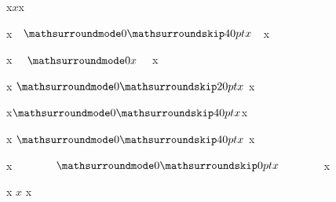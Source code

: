 \startTEXpage[width=6cm] \showmakeup[math]
    x$x$x

    x$\mathsurroundmode0\mathsurroundskip40pt\mathsurround10pt x$x

    x $\mathsurroundmode0\mathsurround10pt x$ x

    x $\mathsurroundmode0\mathsurroundskip20pt x$ x

    x$\mathsurroundmode0\mathsurroundskip40pt \mathsurround0pt x$x

    x $\mathsurroundmode0\mathsurroundskip40pt \mathsurround0pt x$ x

    x$\mathsurroundmode0\mathsurroundskip0pt \mathsurround40pt x$x

    x $ x$ x
\stopTEXpage

